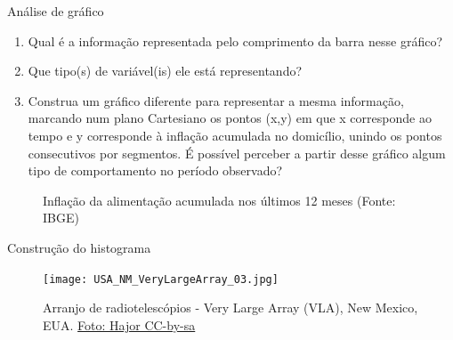 {\begin{task}{ Análise de gráfico}
\begin{enumerate}
\item {} 
Qual é a informação representada pelo comprimento da barra nesse gráfico?

\item {} 
Que tipo(s) de variável(is) ele está representando?

\item {} 
Construa um gráfico diferente para representar a mesma informação, marcando num plano Cartesiano os pontos (x,y) em que x corresponde ao tempo e y corresponde à inflação acumulada no domicílio, unindo os pontos consecutivos por segmentos. É possível perceber a partir desse gráfico algum tipo de comportamento no período observado?

\end{enumerate}

\begin{figure}[H]
\centering
{}
\caption{Inflação da alimentação acumulada nos últimos 12 meses (Fonte: IBGE)}
\label{est1-fig-8}
\end{figure}

\end{task}
\newpage
{}
\label{est1-exp-2}

\label{est1-ativ-9}
\begin{task}{Construção do histograma}

\begin{figure}[H]
\centering
\capstart

\noindent
\texttt{[image: USA\_NM\_VeryLargeArray\_03.jpg]}

\caption{Arranjo de radiotelescópios - Very Large Array (VLA), New Mexico, EUA. \href{https://commons.wikimedia.org/wiki/File:USA.NM.VeryLargeArray.03.jpg}{Foto: Hajor CC-by-sa}}


\end{figure}
\end{task}}
